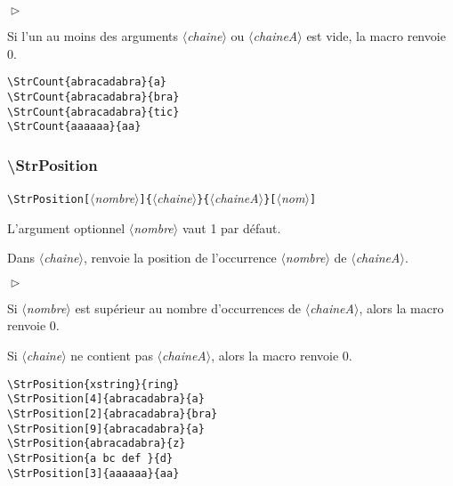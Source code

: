 \documentclass[a4paper,10pt]{article}
\newcommand\argu[1]{$\langle$\textit{#1}$\rangle$}
\newcommand\ARGU[1]{\texttt{\color{black}\{}\argu{#1}\texttt{\color{black}\}}}
\newcommand\arguC[1]{\texttt{\color{black}[}\argu{#1}\texttt{\color{black}]}}
\newenvironment{Conditions}[1][1cm]%
{\begin{list}%
	{$\vartriangleright$}%
	{\setlength{\leftmargin}{#1}
	 \setlength{\itemsep}{0pt}
	 \setlength{\parsep}{0pt}
	 \setlength{\topsep}{2ptplus3ptminus2pt}
	}}%
{\end{list}}
\newcommand\styleexemple{\small\vskip4pt}
\newcommand\verbinline{\lstinline[basicstyle=\normalsize\ttfamily]}
\begin{document}
\begin{Conditions}
	\item Si l'un au moins des arguments \argu{chaine} ou \argu{chaineA} est vide, la macro renvoie 0.
\end{Conditions}

\begin{minipage}[t]{0.65\linewidth}
\begin{lstlisting}
\StrCount{abracadabra}{a}
\StrCount{abracadabra}{bra}
\StrCount{abracadabra}{tic}
\StrCount{aaaaaa}{aa}
\end{lstlisting}%
\end{minipage}\hfill
\begin{minipage}[t]{0.35\linewidth}
	\styleexemple
	\par
	\par
	\par
\end{minipage}%

\subsubsection{\ttfamily\textbackslash StrPosition}
\verbinline|\StrPosition|\arguC{nombre}\ARGU{chaine}\ARGU{chaineA}\arguC{nom}
\smallskip

L'argument optionnel \argu{nombre} vaut 1 par défaut.\par\nobreak\smallskip
Dans \argu{chaine}, renvoie la position de l'occurrence \no\argu{nombre} de \argu{chaineA}.\medskip

\begin{Conditions}
	\item Si \argu{nombre} est supérieur au nombre d'occurrences de \argu{chaineA}, alors la macro renvoie 0.
	\item Si \argu{chaine} ne contient pas \argu{chaineA}, alors la macro renvoie 0.
\end{Conditions}
\medskip

\begin{minipage}[t]{0.65\linewidth}
\begin{lstlisting}
\StrPosition{xstring}{ring}
\StrPosition[4]{abracadabra}{a}
\StrPosition[2]{abracadabra}{bra}
\StrPosition[9]{abracadabra}{a}
\StrPosition{abracadabra}{z}
\StrPosition{a bc def }{d}
\StrPosition[3]{aaaaaa}{aa}
\end{lstlisting}%
\end{minipage}\hfill
\begin{minipage}[t]{0.35\linewidth}
	\styleexemple
	\par
	\par
	\par
	\par
	\par
	\par
\end{minipage}%
\end{document}
